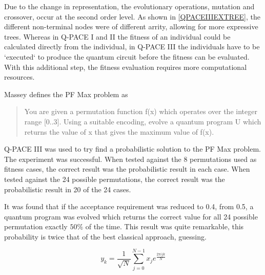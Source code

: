 Due to the change in representation, the evolutionary operations, mutation and crossover, occur at the second order level.
As shown in \ref{QPACEIIIEXTREE}, the different non-terminal nodes were of different arrity, allowing for more expressive trees.
Whereas in Q-PACE I and II the fitness of an individual could be calculated directly from the individual, in Q-PACE III the individuals have to be `executed` to produce the quantum circuit before the fitness can be evaluated.
With this additional step, the fitness evaluation requires more computational resources.

Massey defines the PF Max problem as
\begin{quote}
 You are given a permutation function f(x) which operates over the integer range [0..3].
Using a suitable encoding, evolve a quantum program U which returns the value of x that gives the maximum value of f(x).\cite{masseythesis}
\end{quote}
Q-PACE III was used to try find a probabilistic solution to the PF Max problem.
The experiment was successful.
When tested against the 8 permutations used as fitness cases, the correct result was the probabilistic result in each case.
When tested against the 24 possible permutations, the correct result was the probabilistic result in 20 of the 24 cases.

It was found that if the acceptance requirement was reduced to 0.4, from 0.5, a quantum program was evolved which returns the correct value for all 24 possible permutation exactly $50\%$ of the time.
This result was quite remarkable, this probability is twice that of the best classical approach, guessing.



\begin{equation}
 y_k = \frac{1}{\sqrt{N}} \sum_{j=0}^{N-1}{x_j}e^{\frac{2\pi{ijk}}{N}}
\label{QFTeqn}
\end{equation}

